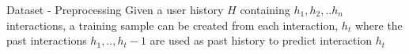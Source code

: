 \documentclass{beamer}
\begin{document}
\begin{frame}{Dataset - Preprocessing}
Given a user history $H$ containing $h_1, h_2, .. h_n$ interactions, a training sample can be created from each interaction, $h_t$ where the past interactions $h_1, .., h_t-1$ are used as past history to predict interaction $h_t$

\begin{columns}[c] %

\begin{figure}%
    \centering
\end{figure}

\begin{figure}%
    \centering
\end{figure}
\end{columns}
\end{frame}
\end{document}
